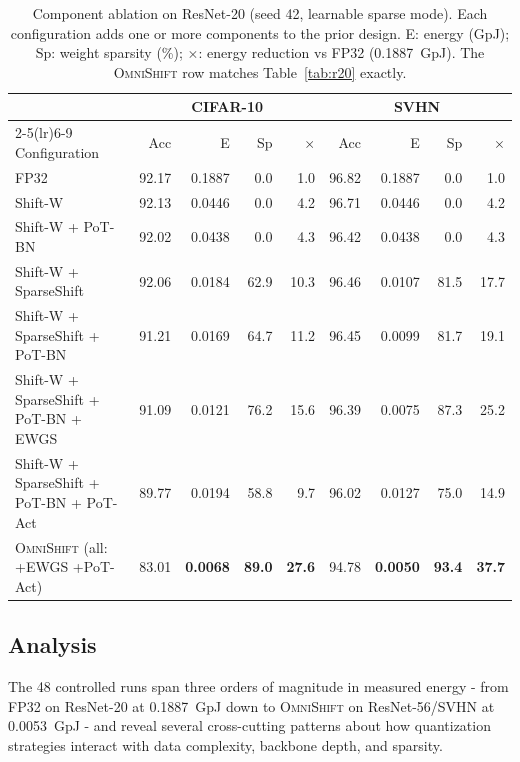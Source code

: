 \documentclass[12pt]{article}
\newcommand{\omnishift}{\textsc{OmniShift}}
\begin{document}
\begin{table}[H]
\centering
\small
\caption{Component ablation on ResNet-20 (seed 42, learnable sparse mode). Each configuration adds one or more components to the prior design. E: energy (GpJ); Sp: weight sparsity (\%); $\times$: energy reduction vs FP32 (0.1887~GpJ). The \omnishift{} row matches Table~\ref{tab:r20} exactly.}
\label{tab:ablation}
\setlength{\tabcolsep}{4pt}
\begin{tabular}{@{}l rrrr rrrr@{}}
\toprule
& \multicolumn{4}{c}{CIFAR-10} & \multicolumn{4}{c}{SVHN} \\
\cmidrule(lr){2-5}\cmidrule(lr){6-9}
Configuration & Acc & E & Sp & $\times$ & Acc & E & Sp & $\times$ \\
\midrule
FP32                                         & 92.17 & 0.1887 &  0.0 &  1.0 & 96.82 & 0.1887 &  0.0 &  1.0 \\
Shift-W                                      & 92.13 & 0.0446 &  0.0 &  4.2 & 96.71 & 0.0446 &  0.0 &  4.2 \\
Shift-W + PoT-BN                             & 92.02 & 0.0438 &  0.0 &  4.3 & 96.42 & 0.0438 &  0.0 &  4.3 \\
Shift-W + SparseShift                        & 92.06 & 0.0184 & 62.9 & 10.3 & 96.46 & 0.0107 & 81.5 & 17.7 \\
Shift-W + SparseShift + PoT-BN               & 91.21 & 0.0169 & 64.7 & 11.2 & 96.45 & 0.0099 & 81.7 & 19.1 \\
Shift-W + SparseShift + PoT-BN + EWGS        & 91.09 & 0.0121 & 76.2 & 15.6 & 96.39 & 0.0075 & 87.3 & 25.2 \\
Shift-W + SparseShift + PoT-BN + PoT-Act     & 89.77 & 0.0194 & 58.8 &  9.7 & 96.02 & 0.0127 & 75.0 & 14.9 \\
\midrule
\omnishift{} (all: +EWGS +PoT-Act)           & 83.01 & \textbf{0.0068} & \textbf{89.0} & \textbf{27.6} & 94.78 & \textbf{0.0050} & \textbf{93.4} & \textbf{37.7} \\
\bottomrule
\end{tabular}
\end{table}

\subsection{Analysis}

The 48 controlled runs span three orders of magnitude in measured energy - from FP32 on ResNet-20 at 0.1887~GpJ down to \omnishift{} on ResNet-56/SVHN at 0.0053~GpJ - and reveal several cross-cutting patterns about how quantization strategies interact with data complexity, backbone depth, and sparsity.
\end{document}
